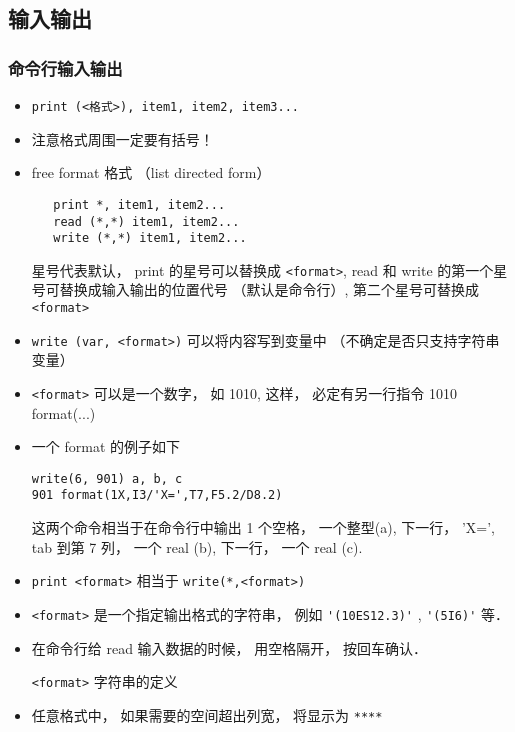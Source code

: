 \subsection{输入输出}

\subsubsection{命令行输入输出}
\begin{itemize}
\item \verb`print (<格式>), item1, item2, item3...`
\item 注意格式周围一定要有括号！
\item free format 格式 （list directed form）
\begin{lstlisting}
   print *, item1, item2...
   read (*,*) item1, item2... 
   write (*,*) item1, item2...
\end{lstlisting}
   星号代表默认， print 的星号可以替换成 \verb`<format>`, read 和 write 的第一个星号可替换成输入输出的位置代号 （默认是命令行）, 第二个星号可替换成 \verb`<format>`
\item \verb`write (var, <format>)` 可以将内容写到变量中 （不确定是否只支持字符串变量）
\item \verb`<format>` 可以是一个数字， 如 1010, 这样， 必定有另一行指令 1010 format(...)
\item 一个 format 的例子如下
\begin{lstlisting}
write(6, 901) a, b, c
901 format(1X,I3/'X=',T7,F5.2/D8.2)
\end{lstlisting}
这两个命令相当于在命令行中输出 1 个空格， 一个整型(a), 下一行， 'X=', tab 到第 7 列， 一个 real (b), 下一行， 一个 real (c).
\item \verb`print <format>` 相当于 \verb`write(*,<format>)`
\item \verb`<format>` 是一个指定输出格式的字符串， 例如 \verb|'(10ES12.3)'| , \verb|'(5I6)'| 等．
\item 在命令行给 read 输入数据的时候， 用空格隔开， 按回车确认．

\verb`<format>` 字符串的定义
\item 任意格式中， 如果需要的空间超出列宽， 将显示为 \verb`****`
\end{itemize}

